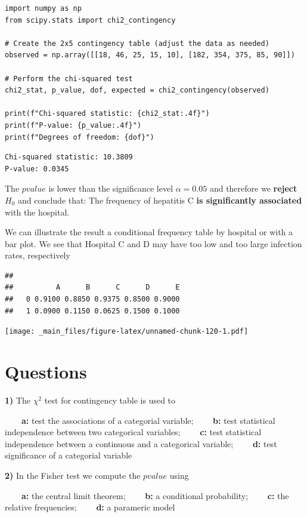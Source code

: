 \documentclass[
]{book}
\begin{document}
\begin{verbatim}
import numpy as np
from scipy.stats import chi2_contingency

# Create the 2x5 contingency table (adjust the data as needed)
observed = np.array([[18, 46, 25, 15, 10], [182, 354, 375, 85, 90]])

# Perform the chi-squared test
chi2_stat, p_value, dof, expected = chi2_contingency(observed)

print(f"Chi-squared statistic: {chi2_stat:.4f}")
print(f"P-value: {p_value:.4f}")
print(f"Degrees of freedom: {dof}")
\end{verbatim}

\begin{verbatim}
Chi-squared statistic: 10.3809
P-value: 0.0345
\end{verbatim}

The \(pvalue\) is lower than the significance level \(\alpha=0.05\) and therefore we \textbf{reject} \(H_0\) and conclude that: The frequency of hepatitis C \textbf{is significantly associated} with the hospital.

We can illustrate the result a conditional frequency table by hospital or with a bar plot. We see that Hospital C and D may have too low and too large infection rates, respectively

\begin{verbatim}
##    
##          A      B      C      D      E
##   0 0.9100 0.8850 0.9375 0.8500 0.9000
##   1 0.0900 0.1150 0.0625 0.1500 0.1000
\end{verbatim}

\texttt{[image: \_main\_files/figure-latex/unnamed-chunk-120-1.pdf]}

\hypertarget{questions-11}{%
\section{Questions}\label{questions-11}}

\textbf{1)} The \(\chi^2\) test for contingency table is used to

\textbf{\(\qquad\)a:} test the associations of a categorial variable;
\textbf{\(\qquad\)b:} test statistical independence between two categorical variables;
\textbf{\(\qquad\)c:} test statistical independence between a continuous and a categorical variable;
\textbf{\(\qquad\)d:} test significance of a categorial variable

\textbf{2)} In the Fisher test we compute the \(pvalue\) using

\textbf{\(\qquad\)a:} the central limit theorem;
\textbf{\(\qquad\)b:} a conditional probability;
\textbf{\(\qquad\)c:} the relative frequencies;
\textbf{\(\qquad\)d:} a parameric model
\end{document}
